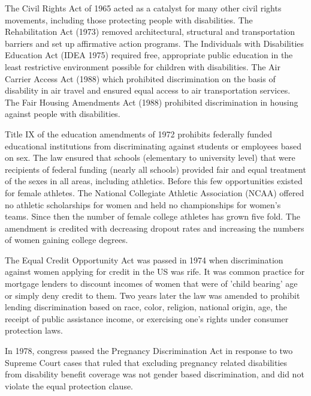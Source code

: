The Civil Rights Act of 1965 acted as a catalyst for many other civil rights movements, including those protecting people with disabilities. The Rehabilitation Act (1973) removed architectural, structural and transportation barriers and set up affirmative action programs. The Individuals with Disabilities Education Act (IDEA 1975) required free, appropriate public education in the least restrictive environment possible for children with disabilities. The Air Carrier Access Act (1988) which prohibited discrimination on the basis of disability in air travel and ensured equal access to air transportation services. The Fair Housing Amendments Act (1988) prohibited discrimination in housing against people with disabilities.

Title IX of the education amendments of 1972 prohibits federally funded educational institutions from discriminating against students or employees based on sex. The law ensured that schools (elementary to university level) that were recipients of federal funding (nearly all schools) provided fair and equal treatment of the sexes in all areas, including athletics. Before this few opportunities existed for female athletes. The National Collegiate Athletic Association (NCAA) offered no athletic scholarships for women and held no championships for women’s teams. Since then the number of female college athletes has grown five fold. The amendment is credited with decreasing dropout rates and increasing the numbers of women gaining college degrees.

The Equal Credit Opportunity Act was passed in 1974 when discrimination against women applying for credit in the US was rife. It was common practice for mortgage lenders to discount incomes of women that were of 'child bearing' age or simply deny credit to them. Two years later the law was amended to prohibit lending discrimination based on race, color, religion, national origin, age, the receipt of public assistance income, or exercising one’s rights under consumer protection laws.

In 1978, congress passed the Pregnancy Discrimination Act in response to two Supreme Court cases that ruled that excluding pregnancy related disabilities from disability benefit coverage was not gender based discrimination, and did not violate the equal protection clause.

